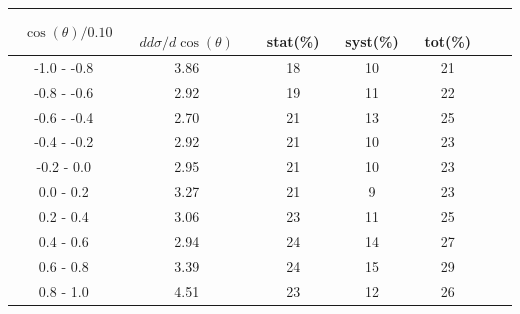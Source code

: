 \documentclass[aps, prd, reprint,showpacs,  preprintnumbers,amsmath,amssymb,superscriptaddress, nofootinbib]{revtex4-1}
\makeatletter
\renewenvironment{table}
  {\def\@captype{table}}
  {}
\makeatother
\begin{document}
\begin{table}
\centering
\begin{tabular}{ccccccc}
\hline
~$\cos(\theta)/0.10$ &~~~ $dd\sigma/d\cos(\theta)$ &~ stat(\%) &~ syst(\%) &~ tot(\%)  \\
\hline
   -1.0 - -0.8 &   3.86 &   18 &   10 &   21 \\
   -0.8 - -0.6 &   2.92 &   19 &   11 &   22 \\
   -0.6 - -0.4 &   2.70 &   21 &   13 &   25 \\
   -0.4 - -0.2 &   2.92 &   21 &   10 &   23 \\
    -0.2 - 0.0 &   2.95 &   21 &   10 &   23 \\
     0.0 - 0.2 &   3.27 &   21 &    9 &   23 \\
     0.2 - 0.4 &   3.06 &   23 &   11 &   25 \\
     0.4 - 0.6 &   2.94 &   24 &   14 &   27 \\
     0.6 - 0.8 &   3.39 &   24 &   15 &   29 \\
     0.8 - 1.0 &   4.51 &   23 &   12 &   26 \\
\hline\hline
\end{tabular}
\caption{ Flux-averaged differential cross section in $\cos(\theta)$, the $\pi^{0}$ zenith-angle cosine in the $p\pi^{0}$ rest frame: 
$d\sigma/d\cos(\theta) (10^{-40}\text{cm}^2/\text{nucleon}/(0.10))$, 
for $\pi^0$+nucleon(s) production with statistical (stat), systematic (syst), and total (tot) uncertainties.
NOTE: Result is for the $\Delta$-enriched subsample with $T_{p}>100$\,MeV and $W<1.4$\,GeV.}
\label{tb:piz-zenith}
\end{table}
\smallskip
\smallskip
\smallskip
\smallskip
\smallskip
\smallskip
\smallskip
\smallskip
\smallskip
\smallskip
\smallskip
\smallskip
\smallskip
\smallskip
\smallskip
\smallskip
\smallskip
\smallskip



\end{document}
